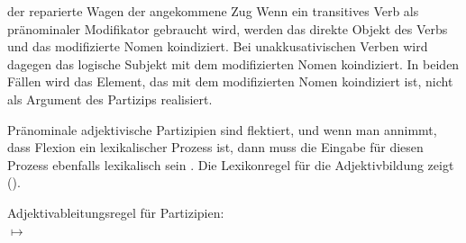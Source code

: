 {\eal
\ex{}\label{ex-der-reparierte-wagen}
der reparierte Wagen
\ex{}\label{ex-angekommene}
der angekommene Zug
\zl
Wenn ein transitives Verb als pränominaler Modifikator gebraucht wird,
werden das direkte Objekt des Verbs und das modifizierte Nomen koindiziert.
Bei unakkusativischen Verben wird dagegen das logische Subjekt mit dem modifizierten Nomen koindiziert.
In beiden Fällen wird das Element, das mit dem modifizierten Nomen koindiziert ist,
nicht als Argument des Partizips realisiert.

Pränominale adjektivische Partizipien sind flektiert, und
wenn man annimmt, dass Flexion ein lexikalischer Prozess ist, dann muss die Eingabe
für diesen Prozess ebenfalls lexikalisch sein \parencites[]{Dowty78a}[]{Bresnan82a}.
%
Die Lexikonregel für die Adjektivbildung zeigt ().

\eas
\label{lr-adjective-formation-da-approach}%
Adjektivableitungsregel für Partizipien:\\[1mm]
%
%
 $\mapsto$\\[7mm]
\hfill{}
\zs

}
